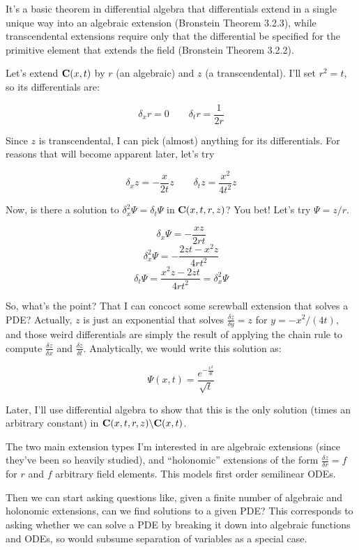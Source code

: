 \documentclass{article}
\newcommand{\C}{\ensuremath{{\bf C}}}
\begin{document}
It's a basic theorem in differential algebra that differentials extend
in a single unique way into an algebraic extension (Bronstein Theorem
3.2.3), while transcendental extensions require only that the
differential be specified for the primitive element that extends the
field (Bronstein Theorem 3.2.2).

Let's extend $\C(x,t)$ by $r$ (an algebraic) and $z$ (a
transcendental).  I'll set $r^2 = t$, so its differentials are:

$$\delta_x r = 0 \qquad \delta_t r = \frac{1}{2r} $$


Since $z$ is transcendental, I can pick (almost) anything for its differentials.  For
reasons that will become apparent later, let's try

$$\delta_x z = -\frac{x}{2t} z \qquad \delta_t z = \frac{x^2}{4t^2} z$$

Now, is there a solution to $\delta_x^2 \Psi = \delta_t \Psi$ in
$\C(x,t,r,z)$?  You bet!  Let's try $\Psi = z/r$.

$$\delta_x \Psi = - \frac{xz}{2rt}$$
$$\delta_x^2 \Psi = - \frac{2zt-x^2z}{4rt^2}$$
$$\delta_t \Psi =  \frac{x^2z - 2zt}{4rt^2} = \delta_x^2 \Psi$$

So, what's the point?  That I can concoct some screwball extension
that solves a PDE?  Actually, $z$ is just an exponential that solves
$\frac{\delta z}{\delta y}=z$ for $y=-x^2/(4t)$, and those weird
differentials are simply the result of applying the chain rule
to compute $\frac{\delta z}{\delta x}$ and $\frac{\delta z}{\delta t}$.
Analytically, we would write this solution as:

$$\Psi(x,t) = \frac{e^{-\frac{x^2}{4t}}}{\sqrt{t}}$$

Later, I'll use differential algebra to show that this is the only
solution (times an arbitrary constant) in $\C(x,t,r,z) \backslash \C(x,t)$.

The two main extension types I'm interested in are algebraic
extensions (since they've been so heavily studied), and ``holonomic''
extensions of the form $\frac{\delta z}{\delta r} = f$ for $r$ and
$f$ arbitrary field elements.  This models first order semilinear ODEs.

Then we can start asking questions like, given a finite number of
algebraic and holonomic extensions, can we find solutions to a given
PDE?  This corresponds to asking whether we can solve a PDE by
breaking it down into algebraic functions and ODEs, so would subsume
separation of variables as a special case.
\end{document}
